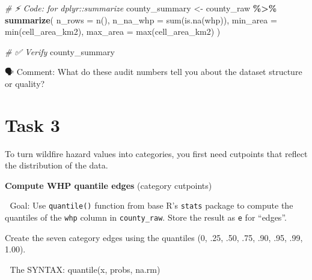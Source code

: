 \documentclass[
  12pt,
]{scrreprt}
\newenvironment{Shaded}{\begin{snugshade}}{\end{snugshade}}
\newcommand{\AttributeTok}[1]{\textcolor[rgb]{0.13,0.29,0.53}{#1}}
\newcommand{\CommentTok}[1]{\textcolor[rgb]{0.56,0.35,0.01}{\textit{#1}}}
\newcommand{\FunctionTok}[1]{\textcolor[rgb]{0.13,0.29,0.53}{\textbf{#1}}}
\newcommand{\NormalTok}[1]{#1}
\newcommand{\OtherTok}[1]{\textcolor[rgb]{0.56,0.35,0.01}{#1}}
\newcommand{\SpecialCharTok}[1]{\textcolor[rgb]{0.81,0.36,0.00}{\textbf{#1}}}
\newcommand{\StringTok}[1]{\textcolor[rgb]{0.31,0.60,0.02}{#1}}
\begin{document}
\begin{Shaded}
\begin{Highlighting}[]
\CommentTok{\# ⚡ Code: for dplyr::summarize}
\StringTok{\textasciigrave{}}\AttributeTok{county\_summary}\StringTok{\textasciigrave{}} \OtherTok{\textless{}{-}}\NormalTok{ county\_raw }\SpecialCharTok{\%\textgreater{}\%}
  \FunctionTok{summarize}\NormalTok{(}
    \AttributeTok{n\_rows   =} \StringTok{\textasciigrave{}}\AttributeTok{n()}\StringTok{\textasciigrave{}}\NormalTok{,}
    \AttributeTok{n\_na\_whp =} \StringTok{\textasciigrave{}}\AttributeTok{sum(is.na(whp))}\StringTok{\textasciigrave{}}\NormalTok{,}
    \AttributeTok{min\_area =} \StringTok{\textasciigrave{}}\AttributeTok{min(cell\_area\_km2)}\StringTok{\textasciigrave{}}\NormalTok{,}
    \AttributeTok{max\_area =} \StringTok{\textasciigrave{}}\AttributeTok{max(cell\_area\_km2)}\StringTok{\textasciigrave{}}
\NormalTok{  )}

\CommentTok{\# ✅ Verify}
\NormalTok{county\_summary}
\end{Highlighting}
\end{Shaded}

🗣 Comment: What do these audit numbers tell you about the dataset structure or quality?

\section{Task 3}\label{task-3}

To turn wildfire hazard values into categories, you first need cutpoints that reflect the distribution of the data.

\textbf{Compute WHP quantile edges} (category cutpoints)

🎯 Goal: Use \texttt{quantile()} function from base R's \texttt{stats} package to compute the quantiles of the \texttt{whp} column in \texttt{county\_raw}. Store the result as \texttt{e} for ``edges''.

Create the seven category edges using the quantiles (0, .25, .50, .75, .90, .95, .99, 1.00).

📜 The SYNTAX: quantile(x, probs, na.rm)

\begin{Shaded}
\end{Shaded}
\end{document}
